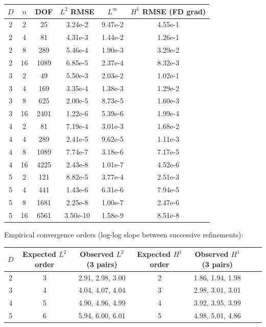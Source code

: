 \documentclass[11pt]{article}
\begin{document}
\begin{center}
\begin{tabular}{cc|cccc}
\toprule
$D$ & $n$ & DOF & $L^2$ RMSE & $L^\infty$ & $H^1$ RMSE (FD grad) \\
\midrule
2 &  2 &   25 & 3.24e-2 & 9.47e-2 & 4.55e-1 \\
2 &  4 &   81 & 4.31e-3 & 1.44e-2 & 1.26e-1 \\
2 &  8 &  289 & 5.46e-4 & 1.90e-3 & 3.29e-2 \\
2 & 16 & 1089 & 6.85e-5 & 2.37e-4 & 8.32e-3 \\
\midrule
3 &  2 &   49 & 5.50e-3 & 2.03e-2 & 1.02e-1 \\
3 &  4 &  169 & 3.35e-4 & 1.38e-3 & 1.29e-2 \\
3 &  8 &  625 & 2.00e-5 & 8.73e-5 & 1.60e-3 \\
3 & 16 & 2401 & 1.22e-6 & 5.39e-6 & 1.99e-4 \\
\midrule
4 &  2 &   81 & 7.19e-4 & 3.01e-3 & 1.68e-2 \\
4 &  4 &  289 & 2.41e-5 & 9.62e-5 & 1.11e-3 \\
4 &  8 & 1089 & 7.74e-7 & 3.18e-6 & 7.17e-5 \\
4 & 16 & 4225 & 2.43e-8 & 1.01e-7 & 4.52e-6 \\
\midrule
5 &  2 &  121 & 8.82e-5 & 3.77e-4 & 2.51e-3 \\
5 &  4 &  441 & 1.43e-6 & 6.31e-6 & 7.94e-5 \\
5 &  8 & 1681 & 2.25e-8 & 1.00e-7 & 2.47e-6 \\
5 & 16 & 6561 & 3.50e-10 & 1.58e-9 & 8.51e-8 \\
\bottomrule
\end{tabular}
\end{center}

Empirical convergence orders (log-log slope between successive refinements):

\begin{center}
\begin{tabular}{ccccccc}
\toprule
$D$ & Expected $L^2$ order & Observed $L^2$ (3 pairs) & Expected $H^1$ order & Observed $H^1$ (3 pairs) \\
\midrule
2 & 3 & 2.91, 2.98, 3.00 & 2 & 1.86, 1.94, 1.98 \\
3 & 4 & 4.04, 4.07, 4.04 & 3 & 2.98, 3.01, 3.01 \\
4 & 5 & 4.90, 4.96, 4.99 & 4 & 3.92, 3.95, 3.99 \\
5 & 6 & 5.94, 6.00, 6.01 & 5 & 4.98, 5.01, 4.86 \\
\bottomrule
\end{tabular}
\end{center}
\end{document}
